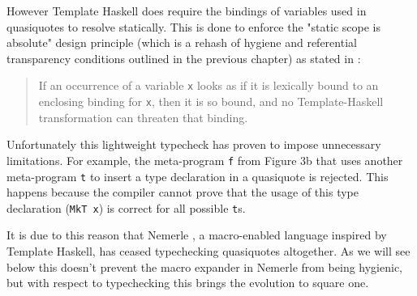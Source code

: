 \documentclass[10pt,journal,a4paper]{IEEEtran}
\begin{document}
However Template Haskell does require the bindings of variables used in quasiquotes to resolve statically.
This is done to enforce the "static scope is absolute" design principle
(which is a rehash of hygiene and referential transparency conditions outlined in the previous chapter)
as stated in \cite{sheard03}:
\begin{quote}
If an occurrence of a variable \texttt{x} looks as if it is lexically bound
to an enclosing binding for \texttt{x},
then it is so bound, and no Template-Haskell transformation can threaten that binding.
\end{quote}

Unfortunately this lightweight typecheck has proven to impose unnecessary limitations.
For example, the meta-program \texttt{f} from Figure 3b
that uses another meta-program \texttt{t} to insert a type declaration in a quasiquote is rejected.
This happens because the compiler cannot prove that the usage of this type declaration (\texttt{MkT x})
is correct for all possible \texttt{t}s.

It is due to this reason that Nemerle \cite{skalski05, skalski04},
a macro-enabled language inspired by Template Haskell,
has ceased typechecking quasiquotes altogether. As we will see below this doesn't prevent
the macro expander in Nemerle from being hygienic, but with respect to typechecking
this brings the evolution to square one.
\end{document}
